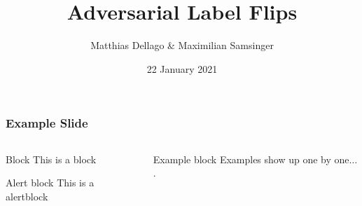 \documentclass[10pt,usepdftitle=false,aspectratio=169]{beamer}
\title{Adversarial Label Flips}
\author{Matthias Dellago \& Maximilian Samsinger}
\date{22 January 2021}
\begin{document}
\DeclarePairedDelimiter\abs{\lvert}{\rvert}%
\DeclarePairedDelimiter\norm{\lVert}{\rVert}%
\DeclarePairedDelimiter\ceil{\lceil}{\rceil}
\DeclarePairedDelimiter\floor{\lfloor}{\rfloor}

\begin{frame}[plain]
	\maketitle
\end{frame}	

\begin{frame}[fragile]
	\frametitle{Example Slide}
	\begin{columns}
		\begin{column}{.5\columnwidth}
			\begin{block}{Block}
				This is a block
			\end{block}
			\begin{alertblock}{Alert block}
				This is a alertblock
			\end{alertblock}
		\end{column}
		\begin{column}{.5\columnwidth}
			\begin{exampleblock}{Example block}
				Examples show up one by one$\dots$.
				\begin{itemize}
				\end{itemize}
			\end{exampleblock}
		\end{column}
	\end{columns}
\end{frame}
\end{document}
